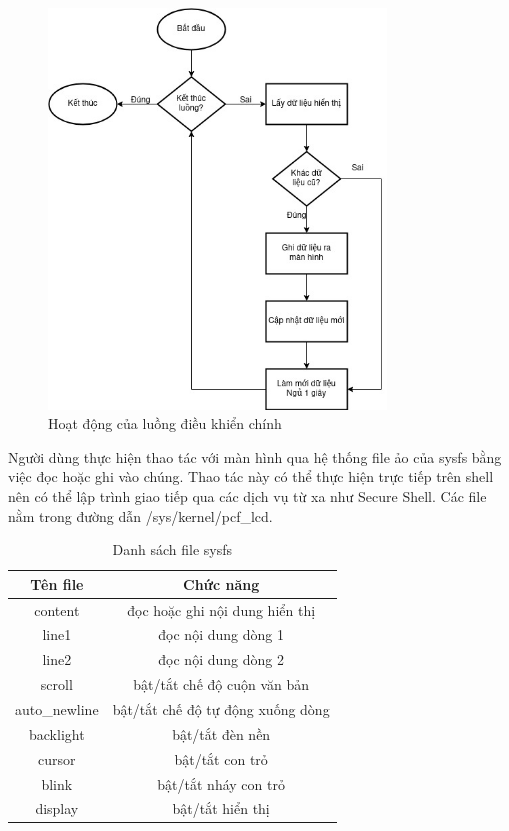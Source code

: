 \begin{figure}[H]
	\centering
	\includegraphics[width=0.8\textwidth]{../images/driver-work-thread.jpg}
	\caption{Hoạt động của luồng điều khiển chính}
	\label{main-thread}
\end{figure}

Người dùng thực hiện thao tác với màn hình qua hệ thống file ảo của sysfs bằng việc đọc hoặc ghi vào chúng. Thao tác này có thể thực hiện trực tiếp trên shell nên có thể lập trình giao tiếp qua các dịch vụ từ xa như Secure Shell. Các file nằm trong đường dẫn /sys/kernel/pcf\_lcd.
\begin{table}[H]
	\centering
	\caption{Danh sách file sysfs}
	\begin{tabular}{|c|c|}
		\hline
		\textbf{Tên file} & \textbf{Chức năng}\\
		\hline
		content & đọc hoặc ghi nội dung hiển thị\\
		line1 & đọc nội dung dòng 1\\
		line2 & đọc nội dung dòng 2\\
		scroll & bật/tắt chế độ cuộn văn bản\\
		auto\_newline & bật/tắt chế độ tự động xuống dòng\\
		backlight & bật/tắt đèn nền \\
		cursor & bật/tắt con trỏ \\
		blink & bật/tắt nháy con trỏ\\
		display & bật/tắt hiển thị\\
		\hline		
	\end{tabular}
\end{table}